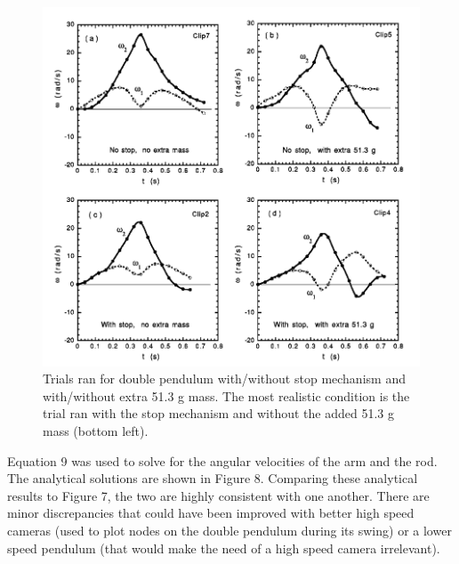 \documentclass[%
 aip,
 amsmath,amssymb,
 reprint,%
 floatfix,%
]{revtex4-1}
\begin{document}
\begin{figure}[H]
	\centering
	\includegraphics[scale=0.25]{angularvelocities.png}
	\caption{Trials ran for double pendulum with/without stop mechanism and with/without extra 51.3 g mass. The most realistic condition is the trial ran with the stop mechanism and without the added 51.3 g mass (bottom left).}
\end{figure}

Equation 9 was used to solve for the angular velocities of the arm and the rod. The analytical solutions are shown in Figure 8. Comparing these analytical results to Figure 7, the two are highly consistent with one another. There are minor discrepancies that could have been improved with better high speed cameras (used to plot nodes on the double pendulum during its swing) or a lower speed pendulum (that would make the need of a high speed camera irrelevant).
\end{document}
